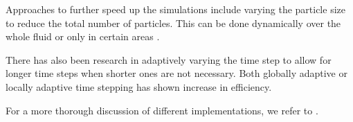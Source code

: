 \documentclass[../../main.tex]{subfiles}
\begin{document}
Approaches to further speed up the simulations include varying the particle size to reduce the total number of particles. This can be done dynamically over the whole fluid \citep{adams2007adaptively,hong2008adaptive} or only in certain areas \citep{solenthaler2011two,horvath2013mass}. 

There has also been research in adaptively varying the time step to allow for longer time steps when shorter ones are not necessary. Both globally adaptive \citep{ihmsen2010boundary,goswami2011time} or locally adaptive \citep{goswami2014regional} time stepping has shown increase in efficiency. 


For a more thorough discussion of different implementations, we refer to \citet{ihmsen2014sph}.
\end{document}
